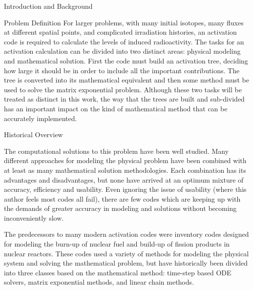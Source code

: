 \begin{chapter}{Introduction and Background}
\begin{section}{Problem Definition\label{sec:intro.prob_def}}
  For larger problems, with many initial isotopes, many fluxes at
  different spatial points, and complicated irradiation histories, an
  activation code is required to calculate the levels of induced
  radioactivity.  The tasks for an activation calculation can be
  divided into two distinct areas: physical modeling and mathematical
  solution.  First the code must build an activation tree, deciding
  how large it should be in order to include all the important
  contributions.  The tree is converted into its mathematical
  equivalent and then some method must be used to solve the matrix
  exponential problem.  Although these two tasks will be treated as
  distinct in this work, the way that the trees are built and
  sub-divided has an important impact on the kind of mathematical
  method that can be accurately implemented.

\end{section}

\begin{section}{Historical Overview}
  
  The computational solutions to this problem have been well
  studied\cite{adjoint}.  Many different approaches for modeling the
  physical problem have been combined with at least as many
  mathematical solution methodologies.  Each combination has its
  advantages and disadvantages, but none have arrived at an optimum
  mixture of accuracy, efficiency and usability.  Even ignoring the
  issue of usability (where this author feels most codes all fail),
  there are few codes which are keeping up with the demands of greater
  accuracy in modeling and solutions without becoming inconveniently
  slow.

  The predecessors to many modern activation codes were inventory
  codes designed for modeling the burn-up of nuclear fuel and
  build-up of fission products in nuclear reactors.  These codes used
  a variety of methods for modeling the physical system and solving
  the mathematical problem, but have historically been divided into
  three classes based on the mathematical method: time-step based ODE
  solvers, matrix exponential methods, and linear chain methods.
  

\end{section}
\end{chapter}
